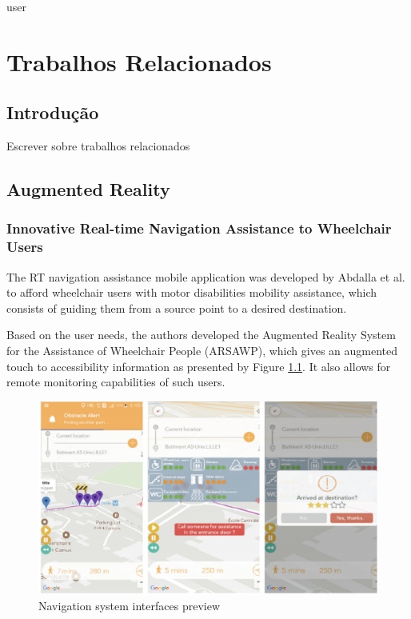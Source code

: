 user\chapter{Trabalhos Relacionados}

\section{Introdução}

Escrever sobre trabalhos relacionados

\section{Augmented Reality}
\subsection{Innovative Real-time Navigation Assistance to Wheelchair Users}
The  RT navigation assistance mobile application was developed by Abdalla et al. \cite{abdallah2019} to afford wheelchair users with motor disabilities mobility assistance, which consists of guiding them from a source point to a desired destination. 

Based on the user needs, the authors developed the Augmented Reality System for the Assistance of Wheelchair People (ARSAWP), which gives an augmented touch to accessibility information as presented by Figure \ref{fig:abdallah2019}. It also allows for remote monitoring capabilities of such users. 

\begin{figure}[!hbt]
\begin{center}
\includegraphics[width=0.9 \textwidth]{img/cap3/abdallah2019}
\caption{Navigation system interfaces preview \cite{abdallah2019}}
\label{fig:abdallah2019}
\end{center}
\end{figure}


